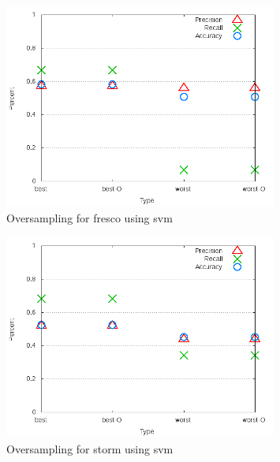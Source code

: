 

\begin{figure}[!ht]
    \centering
        \includegraphics[width=0.8\textwidth]{images/svm/test_4/fresco_sample_range}
        \caption{Oversampling for fresco using \gls{svm}}
        \label{fig:test_4_fresco_svm}
\end{figure}

\begin{figure}[!ht]
    \centering
        \includegraphics[width=0.8\textwidth]{images/svm/test_4/storm_sample_range}
        \caption{Oversampling for storm using \gls{svm}}
        \label{fig:test_4_storm_svm}
\end{figure}

